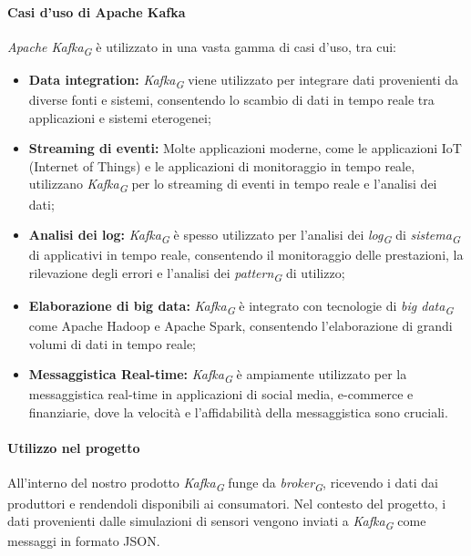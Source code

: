 \paragraph{Casi d'uso di Apache Kafka}

\textit{Apache Kafka}\textsubscript{\textit{G}} è utilizzato in una vasta gamma di casi d'uso, tra cui:

\begin{itemize}
  \item \textbf{Data integration:} \textit{Kafka}\textsubscript{\textit{G}} viene utilizzato per integrare dati provenienti da diverse fonti e sistemi, consentendo lo scambio di dati in tempo reale tra applicazioni e sistemi eterogenei;
  
  \item \textbf{Streaming di eventi:} Molte applicazioni moderne, come le applicazioni IoT (Internet of Things) e le applicazioni di monitoraggio in tempo reale, utilizzano \textit{Kafka}\textsubscript{\textit{G}} per lo streaming di eventi in tempo reale e l'analisi dei dati;
  
  \item \textbf{Analisi dei log:} \textit{Kafka}\textsubscript{\textit{G}} è spesso utilizzato per l'analisi dei \textit{log}\textsubscript{\textit{G}} di \textit{sistema}\textsubscript{\textit{G}} di applicativi in tempo reale, consentendo il monitoraggio delle prestazioni, la rilevazione degli errori e l'analisi dei \textit{pattern}\textsubscript{\textit{G}} di utilizzo;
  
  \item \textbf{Elaborazione di big data:} \textit{Kafka}\textsubscript{\textit{G}} è integrato con tecnologie di \textit{big data}\textsubscript{\textit{G}} come Apache Hadoop e Apache Spark, consentendo l'elaborazione di grandi volumi di dati in tempo reale;
  
  \item \textbf{Messaggistica Real-time:} \textit{Kafka}\textsubscript{\textit{G}} è ampiamente utilizzato per la messaggistica real-time in applicazioni di social media, e-commerce e finanziarie, dove la velocità e l'affidabilità della messaggistica sono cruciali.
\end{itemize}

\paragraph{Utilizzo nel progetto}
All'interno del nostro prodotto \textit{Kafka}\textsubscript{\textit{G}} funge da \textit{broker}\textsubscript{\textit{G}}, ricevendo i dati dai produttori e rendendoli disponibili ai consumatori. Nel contesto del progetto, i dati provenienti dalle simulazioni di sensori vengono inviati a \textit{Kafka}\textsubscript{\textit{G}} come messaggi in formato JSON.

